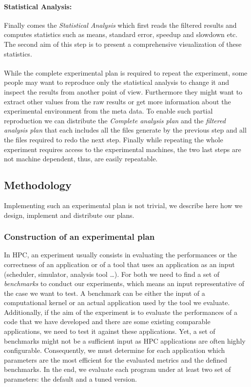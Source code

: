 \paragraph{Statistical Analysis:}
Finally comes the \emph{Statistical Analysis} which first reads the filtered results and computes statistics such as means, standard error, speedup and slowdown etc.
The second aim of this step is to present a comprehensive visualization of these statistics.

\paragraph{}
While the complete experimental plan is required to repeat the experiment, some people may want to reproduce only the statistical analysis to change it and inspect the results from another point of view.
Furthermore they might want to extract other values from the raw results or get more information about the experimental environment from the meta data.
To enable such partial reproduction we can distribute the \emph{Complete analysis plan} and the \emph{filtered analysis plan} that each includes all the files generate by the previous step and all the files required to redo the next step.
Finally while repeating the whole experiment requires access to the experimental machines, the two last steps are not machine dependent, thus, are easily repeatable.

\subsection{Methodology}

Implementing such an experimental plan is not trivial, we describe here how we design, implement and distribute our plans.

\subsubsection{Construction of an experimental plan}

In \gls{HPC}, an experiment usually consists in evaluating the performances or the correctness of an application or of a tool that uses an application as an input (scheduler, simulator, analysis tool \ldots).
For both we need to find a set of \emph{benchmarks} to conduct our experiments, which means an input representative of the case we want to test.
A benchmark can be either the input of a computational kernel or an actual application used by the tool we evaluate.
Additionally, if the aim of the experiment is to evaluate the performances of a code that we have developed and there are some existing comparable applications, we need to test it against these applications.
Yet, a set of benchmarks might not be a sufficient input as \gls{HPC} applications are often highly configurable.
Consequently, we must determine for each application which parameters are the most efficient for the evaluated metrics and the defined benchmarks.
In the end, we evaluate each program under at least two set of parameters: the default and a tuned version.

